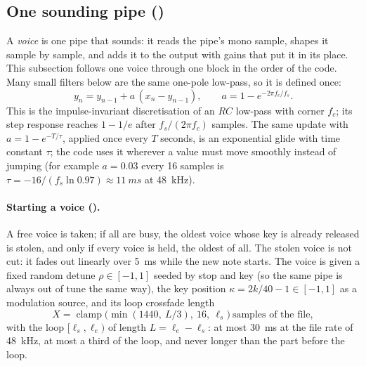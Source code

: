 \subsection{One sounding pipe ()}
\label{sec:math-voice}
A \emph{voice} is one pipe that sounds: it reads the pipe's mono sample, shapes it sample by sample, and adds it to
the output with gains that put it in its place. This subsection follows one voice through one block in the order of
the code. Many small filters below are the same one-pole low-pass, so it is defined once:
\begin{equation}
  y_n = y_{n-1} + a\,(x_n - y_{n-1}),\qquad a = 1 - e^{-2\pi f_c/f_s}.
  \label{eq:onepole}
\end{equation}
This is the impulse-invariant discretisation of an $RC$ low-pass with corner $f_c$; its step response reaches
$1-1/e$ after $f_s/(2\pi f_c)$ samples. The same update with $a = 1-e^{-T/\tau}$, applied once every $T$ seconds,
is an exponential glide with time constant $\tau$; the code uses it wherever a value must move smoothly instead of
jumping (for example $a=0.03$ every 16 samples is $\tau = -16/(f_s\ln 0.97) \approx \SI{11}{ms}$ at \SI{48}{kHz}).

\paragraph{Starting a voice ().} A free voice is taken; if all are busy, the oldest voice whose key is
already released is stolen, and only if every voice is held, the oldest of all. The stolen voice is not cut: it
fades out linearly over \SI{5}{ms} while the new note starts. The voice is given a fixed random detune
$\rho\in[-1,1]$ seeded by stop and key (so the same pipe is always out of tune the same way), the key position
$\kappa = 2k/40-1\in[-1,1]$ as a modulation source, and its loop crossfade length
\begin{equation}
  X = \operatorname{clamp}\bigl(\min(1440,\ L/3),\ 16,\ \ell_s\bigr)\ \text{samples of the file},
\end{equation}
with the loop $[\ell_s,\ell_e)$ of length $L = \ell_e-\ell_s$: at most \SI{30}{ms} at the file rate of
\SI{48}{kHz}, at most a third of the loop, and never longer than the part before the loop.

